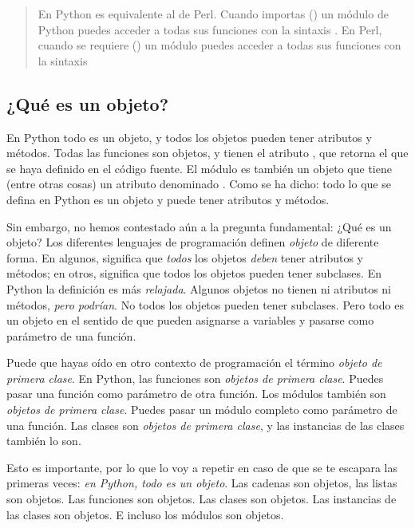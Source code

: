 \begin{quote}
En Python  es equivalente al  de Perl.
Cuando importas () un módulo de Python puedes acceder a todas sus funciones con la sintaxis . En Perl, cuando se requiere () un módulo puedes acceder a todas sus funciones con la sintaxis 
\end{quote}

\subsection{¿Qué es un objeto?}

En Python todo es un objeto, y todos los objetos pueden tener atributos y métodos. Todas las funciones son objetos, y tienen el atributo , que retorna el  que se haya definido en el código fuente. El módulo  es también un objeto que tiene (entre otras cosas) un atributo denominado . Como se ha dicho: todo lo que se defina en Python es un objeto y puede tener atributos y métodos.

Sin embargo, no hemos contestado aún a la pregunta fundamental: ¿Qué es un objeto? Los diferentes lenguajes de programación definen \emph{objeto} de diferente forma. En algunos, significa que \emph{todos} los objetos \emph{deben} tener atributos y métodos; en otros, significa que todos los objetos pueden tener subclases. En Python la definición es más \emph{relajada}. Algunos objetos no tienen ni atributos ni métodos, \emph{pero podrían}. No todos los objetos pueden tener subclases. Pero todo es un objeto en el sentido de que pueden asignarse a variables y pasarse como parámetro de una función.

Puede que hayas oído en otro contexto de programación el término \emph{objeto de primera clase}. En Python, las funciones son \emph{objetos de primera clase}. Puedes pasar una función como parámetro de otra función. Los módulos también son \emph{objetos de primera clase}. Puedes pasar un módulo completo como parámetro de una función. Las clases son \emph{objetos de primera clase}, y las instancias de las clases también lo son.

Esto es importante, por lo que lo voy a repetir en caso de que se te escapara las primeras veces: \emph{en Python, todo es un objeto}. Las cadenas son objetos, las listas son objetos. Las funciones son objetos. Las clases son objetos. Las instancias de las clases son objetos. E incluso los módulos son objetos.

